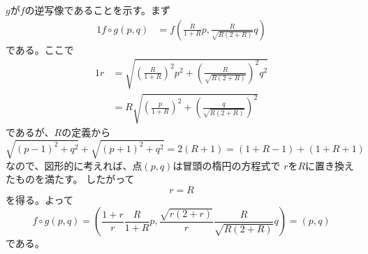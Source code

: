 \documentclass[report]{jlreq}
\begin{document}
\begin{answer}
    $g$が$f$の逆写像であることを示す。まず
    \begin{alignat}{1}
        f \circ g(p, q)
            &= f\left(\frac{R}{1 + R} p, \frac{R}{\sqrt{R (2 + R)}} q\right)
    \end{alignat}
    である。ここで
    \begin{alignat}{1}
        r
            &= \sqrt{
                \left(\frac{R}{1 + R}\right)^2 p^2
                +
                \left(\frac{R}{\sqrt{R (2 + R)}}\right)^2 q^2
            } \\
            &= R \sqrt{
                \left(\frac{p}{1 + R}\right)^2
                +
                \left(\frac{q}{\sqrt{R (2 + R)}}\right)^2
            }
    \end{alignat}
    であるが、$R$の定義から
    \begin{equation}
        \sqrt{(p - 1)^2 + q^2} + \sqrt{(p + 1)^2 + q^2}
            = 2 (R + 1)
            = (1 + R - 1) + (1 + R + 1)
    \end{equation}
    なので、図形的に考えれば、点$(p, q)$は冒頭の楕円の方程式で
    $r$を$R$に置き換えたものを満たす。
    したがって
    \begin{equation}
        r = R
    \end{equation}
    を得る。よって
    \begin{equation}
        f \circ g(p, q)
            = \left(
                \frac{1 + r}{r} \frac{R}{1 + R} p,
                \frac{\sqrt{r (2 + r)}}{r} \frac{R}{\sqrt{R (2 + R)}} q
            \right)
            = (p, q)
    \end{equation}
    である。


\end{answer}
\end{document}
